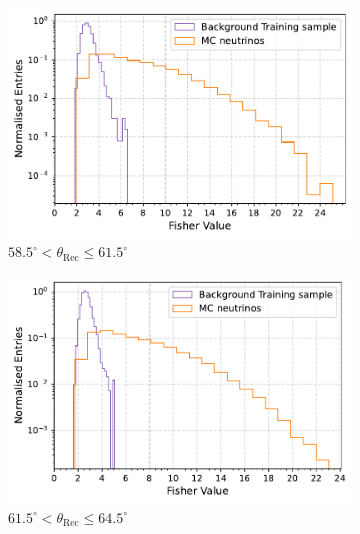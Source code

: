\begin{figure}[h!]
  \centering
   \begin{subfigure}[l]{.48\textwidth}
     \centering
     \includegraphics[width=\linewidth]{thesis_figures/Nu_analysis/Fisher_plots/Fisher_nu_bkg_region_58.5_61.5.pdf}
     \caption{$ 58.5^{\circ} <\theta_{\text{Rec}} \leq 61.5^{\circ}$ }
   \end{subfigure}
   \begin{subfigure}[r]{.48\textwidth}
     \centering
     \includegraphics[width=\linewidth]{thesis_figures/Nu_analysis/Fisher_plots/Fisher_nu_bkg_region_61.5_64.5.pdf}
     \caption{$61.5^{\circ} <\theta_{\text{Rec}} \leq 64.5^{\circ}$}
    \end{subfigure}
    \hfill
    \begin{subfigure}[l]{.48\textwidth}
      \centering

\end{subfigure}
\end{figure}

